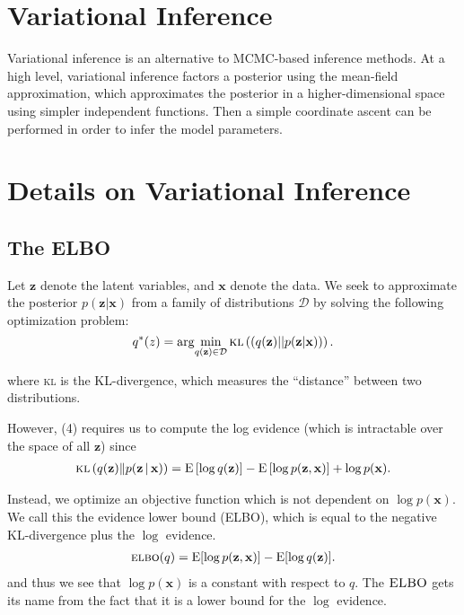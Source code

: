 \documentclass[11pt]{article}
\newcommand{\bx}{\ensuremath{\mathbf{x}}}
\newcommand{\bz}{\ensuremath{\mathbf{z}}}
\newcommand{\kl}[1]{\textsc{kl}\left(#1\right)}
\newcommand{\g}{\,\vert\,}
\newcommand{\ELBO}{\textsc{elbo}}
\newcommand{\E}{\mathrm{E}}
\begin{document}
\section{Variational Inference}

Variational inference is an alternative to MCMC-based inference methods. At a high level, variational inference factors a posterior using the mean-field approximation, which approximates the posterior in a higher-dimensional space using simpler independent functions. Then a simple coordinate ascent can be performed in order to infer the model parameters.

\section{Details on Variational Inference}

\subsection{The \textsc{ELBO}}

Let $\mathbf{z}$ denote the latent variables, and $\mathbf{x}$ denote the data. We seek to approximate the posterior $p(\mathbf{z}|\mathbf{x})$ from a family of distributions $\mathcal{D}$ by solving the following optimization problem: 
\begin{equation}
q^*(z) = \arg\!\min_{q(\mathbf{z}) \in \mathcal{D}} \kl{(q(\mathbf{z}) || p(\mathbf{z}|\mathbf{x}))}.
\end{equation}

where \textsc{kl} is the KL-divergence, which measures the ``distance'' between two distributions. 

However, (4) requires us to compute the log evidence (which is intractable over the space of all $\mathbf{z}$) since 
\begin{align}
  \kl{q(\bz) \| p(\bz \g \bx)} =
  \E\left[\log q(\bz)\right] -
  \E\left[\log p(\bz, \bx)\right] +
  \log p(\bx). 
\end{align}

Instead, we optimize an objective function which is not dependent on $\log p(\bx)$. We call this the evidence lower bound (\textsc{ELBO}), which is equal to the negative \textsc{KL}-divergence plus the $\log$ evidence.
\begin{align}
  \ELBO(q) =
  \E{[\log p(\bz, \bx)]} -
  \E{[\log q(\bz)]}.
\end{align}
and thus we see that $\log p(\bx)$ is a constant with respect to $q$. The $\textsc{ELBO}$ gets its name from the fact that it is a lower bound for the $\log$ evidence. 
\end{document}
